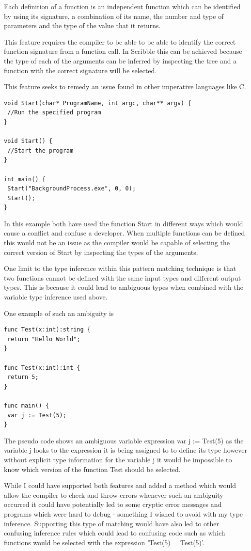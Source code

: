 \documentclass[]{final_report}
\begin{document}
Each definition of a function is an independent function which can be identified by using its signature, a combination of its name, the number and type of parameters and the type of the value that it returns.

This feature requires the compiler to be able to be able to identify the correct function signature from a function call. In Scribble this can be achieved because the type of each of the arguments can be inferred by inspecting the tree and a function with the correct signature will be selected.

This feature seeks to remedy an issue found in other imperative languages like C.

\begin{verbatim}
void Start(char* ProgramName, int argc, char** argv) {
 //Run the specified program
}

void Start() {
 //Start the program
}

int main() {
 Start("BackgroundProcess.exe", 0, 0);
 Start();
}
\end{verbatim}

In this example both have used the function Start in different ways which would cause a conflict and confuse a developer. When multiple functions can be defined this would not be an issue as the compiler would be capable of selecting the correct version of Start by inspecting the types of the arguments.

One limit to the type inference within this pattern matching technique is that two functions cannot be defined with the same input types and different output types. This is because it could lead to ambiguous types when combined with the variable type inference used above.

One example of such an ambiguity is
\begin{verbatim}
func Test(x:int):string {
 return "Hello World";
}

func Test(x:int):int {
 return 5; 
}

func main() { 
 var j := Test(5);
}
\end{verbatim}

The pseudo code shows an ambiguous variable expression var j := Test(5) as the variable j looks to the expression it is being assigned to to define its type however without explicit type information for the variable j it would be impossible to know which version of the function Test should be selected.

While I could have supported both features and added a method which would allow the compiler to check and throw errors whenever such an ambiguity occurred it could have potentially led to some cryptic error messages and programs which were hard to debug - something I wished to avoid with my type inference. Supporting this type of matching would have also led to other confusing inference rules which could lead to confusing code such as which functions would be selected with the expression 'Test(5) = Test(5)'.
\end{document}
